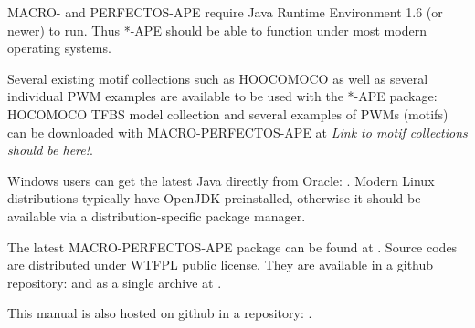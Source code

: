 MACRO- and PERFECTOS-APE require Java Runtime Environment 1.6 (or newer) to run.
Thus *-APE should be able to function under most modern operating systems.

Several existing motif collections such as HOOCOMOCO as well as several individual PWM examples are available to be used with the *-APE package:
HOCOMOCO  TFBS model collection and several examples of PWMs (motifs) can be downloaded with MACRO-PERFECTOS-APE at \emph{Link to motif collections should be here!}.

Windows users can get the latest Java directly from Oracle: .
Modern Linux distributions typically have OpenJDK preinstalled, otherwise it should be available via a distribution-specific package manager.

The latest MACRO-PERFECTOS-APE package can be found at . Source codes are distributed under WTFPL public license. They are available in a github repository:  and as a single archive at .

This manual is also hosted on github in a repository: .
